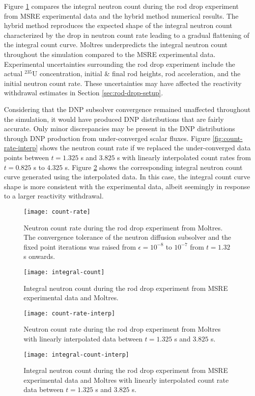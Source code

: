 Figure \ref{fig:integral-count} compares the integral neutron count during the rod drop experiment
from \gls{MSRE} experimental data and the hybrid method numerical results. The hybrid method
reproduces the expected shape of the integral
neutron count characterized by the drop in neutron count rate leading to a gradual flattening of
the integral count curve. Moltres underpredicts the integral neutron count throughout the
simulation compared to the \gls{MSRE} experimental data.
Experimental uncertainties surrounding the rod drop experiment include the actual $^{235}$U
concentration, initial \& final rod heights, rod acceleration, and the initial neutron count rate.
These uncertainties may have affected the reactivity withdrawal estimates in Section
\ref{sec:rod-drop-setup}.

Considering that the \gls{DNP} subsolver convergence remained unaffected throughout the simulation,
it would have produced \gls{DNP} distributions that are fairly accurate. Only minor discrepancies
may be present in the \gls{DNP} distributions through \gls{DNP} production from under-converged
scalar fluxes. Figure \ref{fig:count-rate-interp} shows the neutron count rate if we replaced the
under-converged data points between $t=1.325$ s and $3.825$ s with linearly interpolated count
rates from $t=0.825$ s to $4.325$ s. Figure \ref{fig:integral-count-interp} shows the corresponding
integral neutron count curve generated using the interpolated data. In this case, the integral
count curve shape is more consistent with the experimental data, albeit seemingly in response to a
larger reactivity withdrawal.

\begin{figure}[p]
  \centering
  \texttt{[image: count-rate]}
  \caption{Neutron count rate during the rod drop experiment from Moltres. The convergence tolerance
  of the neutron diffusion subsolver and the fixed point iterations was raised from $\epsilon=10^{-8}$
  to $10^{-7}$ from $t=1.32$ s onwards.}
  \label{fig:count-rate}
  \texttt{[image: integral-count]}
  \caption{Integral neutron count during the rod drop experiment from \gls{MSRE} experimental data
  and Moltres.}
  \label{fig:integral-count}
\end{figure}

\begin{figure}[p]
  \centering
  \texttt{[image: count-rate-interp]}
  \caption{Neutron count rate during the rod drop experiment from Moltres with linearly interpolated
    data between $t=1.325$ s and $3.825$ s.}
  \label{fig:count-rate-interp}
  \texttt{[image: integral-count-interp]}
  \caption{Integral neutron count during the rod drop experiment from \gls{MSRE} experimental data
  and Moltres with linearly interpolated count rate data between $t=1.325$ s and $3.825$ s.}
  \label{fig:integral-count-interp}
\end{figure}

